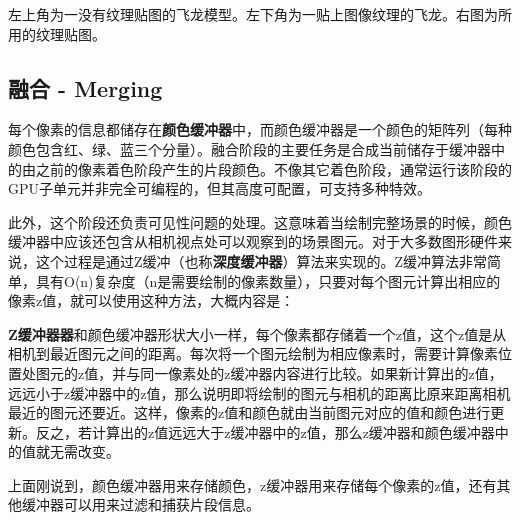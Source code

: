 \documentclass[UTF8,a4paper,12pt]{ctexbook}
\begin{document}
				左上角为一没有纹理贴图的飞龙模型。左下角为一贴上图像纹理的飞龙。右图为所用的纹理贴图。
				
			\subsection{融合 - Merging}
				每个像素的信息都储存在\textbf{颜色缓冲器}中，而颜色缓冲器是一个颜色的矩阵列（每种颜色包含红、绿、蓝三个分量）。融合阶段的主要任务是合成当前储存于缓冲器中的由之前的像素着色阶段产生的片段颜色。不像其它着色阶段，通常运行该阶段的GPU子单元并非完全可编程的，但其高度可配置，可支持多种特效。
				
				此外，这个阶段还负责可见性问题的处理。这意味着当绘制完整场景的时候，颜色缓冲器中应该还包含从相机视点处可以观察到的场景图元。对于大多数图形硬件来说，这个过程是通过Z缓冲（也称\textbf{深度缓冲器}）算法来实现的。Z缓冲算法非常简单，具有O(n)复杂度（n是需要绘制的像素数量），只要对每个图元计算出相应的像素z值，就可以使用这种方法，大概内容是：
				
				\textbf{Z缓冲器器}和颜色缓冲器形状大小一样，每个像素都存储着一个z值，这个z值是从相机到最近图元之间的距离。每次将一个图元绘制为相应像素时，需要计算像素位置处图元的z值，并与同一像素处的z缓冲器内容进行比较。如果新计算出的z值，远远小于z缓冲器中的z值，那么说明即将绘制的图元与相机的距离比原来距离相机最近的图元还要近。这样，像素的z值和颜色就由当前图元对应的值和颜色进行更新。反之，若计算出的z值远远大于z缓冲器中的z值，那么z缓冲器和颜色缓冲器中的值就无需改变。
														
				上面刚说到，颜色缓冲器用来存储颜色，z缓冲器用来存储每个像素的z值，还有其他缓冲器可以用来过滤和捕获片段信息。
				
\end{document}

